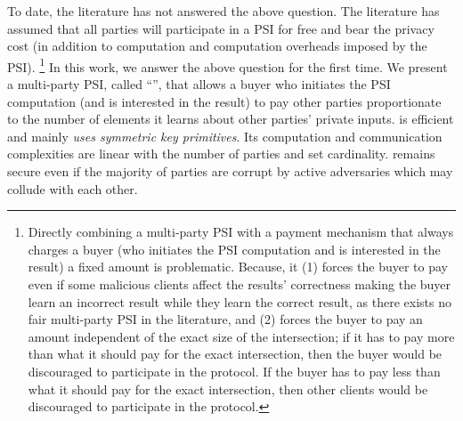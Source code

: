 To date, the literature has not answered the above question. The literature has assumed that all parties will participate in a PSI for free and bear the privacy cost (in addition to computation and computation overheads imposed by the PSI). \footnote{Directly combining a multi-party PSI with a payment mechanism that always charges a buyer (who initiates the PSI computation and is interested in the result) a fixed amount is problematic. Because, it (1) forces the buyer to pay even if some malicious clients affect the results' correctness making the buyer learn an incorrect result while they learn the correct result, as there exists no fair multi-party PSI in the literature, and (2) forces the buyer to pay an amount independent of the exact size of the intersection; if it has to pay more than what it should pay for the exact intersection, then the buyer would be discouraged to participate in the protocol. If the buyer has to pay less than what it should pay for the exact intersection, then other clients would be discouraged to participate in the protocol.} 
%
In this work, we answer the above question for the first time. We present a multi-party PSI, called ``\withRew'', that allows a buyer who initiates the PSI computation (and is interested in the result) to pay other parties proportionate to the number of elements it learns about other parties' private inputs. 
%
%
\withRew is efficient and mainly \emph{uses symmetric key primitives}.  Its computation and communication complexities are linear with the number of parties and set cardinality. \withRew remains secure even if the majority of parties are corrupt by active adversaries which may collude with each other. 










